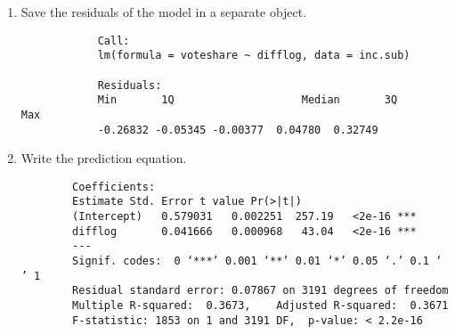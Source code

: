 \documentclass[12pt,letterpaper]{article}
\begin{document}
\begin{enumerate}
	\item Save the residuals of the model in a separate object.
	\vspace{0.05cm}
	
				\begin{verbatim}
			Call:
			lm(formula = voteshare ~ difflog, data = inc.sub)
		
			Residuals:
			Min       1Q   					Median       3Q      Max  
			-0.26832 -0.05345 -0.00377  0.04780  0.32749 
				\end{verbatim}
	
	
	\item Write the prediction equation.
	\vspace{0.05cm}	
	
				\begin{verbatim}
		Coefficients:
		Estimate Std. Error t value Pr(>|t|)    
		(Intercept)   0.579031   0.002251  257.19   <2e-16 ***
		difflog       0.041666   0.000968   43.04   <2e-16 ***
		---
		Signif. codes:  0 ‘***’ 0.001 ‘**’ 0.01 ‘*’ 0.05 ‘.’ 0.1 ‘ ’ 1
		Residual standard error: 0.07867 on 3191 degrees of freedom
		Multiple R-squared:  0.3673,	Adjusted R-squared:  0.3671 
		F-statistic: 1853 on 1 and 3191 DF,  p-value: < 2.2e-16
	\end{verbatim}
	
\end{enumerate}			
\end{document}
